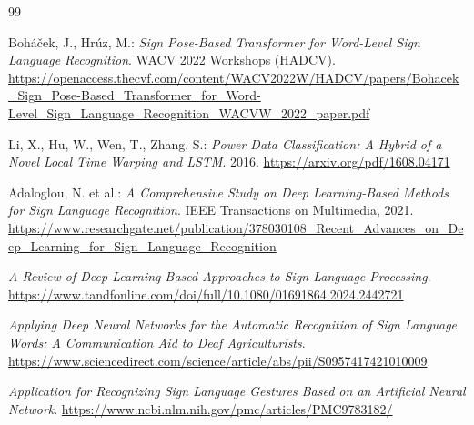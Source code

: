 
\begin{thebibliography}{99}
\label{chap:bibliography}

Boh\'a\v{c}ek, J., Hr\'uz, M.:
\emph{Sign Pose-Based Transformer for Word-Level Sign Language Recognition}.
WACV 2022 Workshops (HADCV).
\url{https://openaccess.thecvf.com/content/WACV2022W/HADCV/papers/Bohacek_Sign_Pose-Based_Transformer_for_Word-Level_Sign_Language_Recognition_WACVW_2022_paper.pdf}

Li, X., Hu, W., Wen, T., Zhang, S.:
\emph{Power Data Classification: A Hybrid of a Novel Local Time Warping and
LSTM}. 2016.
\url{https://arxiv.org/pdf/1608.04171}

Adaloglou, N. et al.:
\emph{A Comprehensive Study on Deep Learning-Based Methods for Sign Language
Recognition}. IEEE Transactions on Multimedia, 2021.
\url{https://www.researchgate.net/publication/378030108_Recent_Advances_on_Deep_Learning_for_Sign_Language_Recognition}

\emph{A Review of Deep Learning-Based Approaches to Sign Language Processing}.
\url{https://www.tandfonline.com/doi/full/10.1080/01691864.2024.2442721}

\emph{Applying Deep Neural Networks for the Automatic Recognition of Sign
Language Words: A Communication Aid to Deaf Agriculturists}.
\url{https://www.sciencedirect.com/science/article/abs/pii/S0957417421010009}

\emph{Application for Recognizing Sign Language Gestures Based on an
Artificial Neural Network}.
\url{https://www.ncbi.nlm.nih.gov/pmc/articles/PMC9783182/}


\end{thebibliography}
